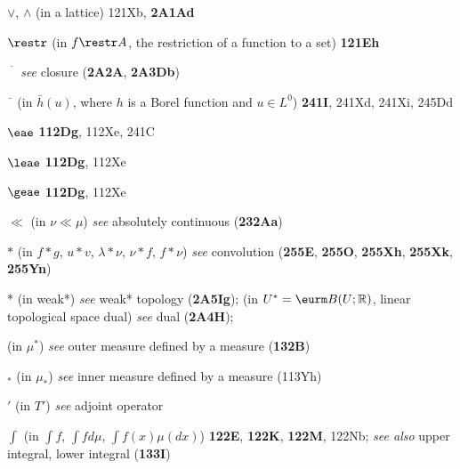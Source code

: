 $\vee$, $\wedge$ (in a lattice) 121Xb, {\bf 2A1Ad}






$\restr$ (in $f\restr A$, the restriction of a function to a set) {\bf
121Eh}

$\overline{\phantom{A}}$ {\it see} closure ({\bf 2A2A}, {\bf
2A3Db})


$\bar{\phantom{g}}$ (in $\bar h(u)$, where $h$ is a Borel function
and $u\in L^0$) {\bf 241I}, 241Xd, 241Xi, 245Dd


$\eae$ {\bf 112Dg}, 112Xe, 241C

$\leae$ {\bf 112Dg}, 112Xe

$\geae$ {\bf 112Dg}, 112Xe







$\ll$ (in $\nu\ll\mu$) {\it see} absolutely continuous ({\bf 232Aa})





















$*$ (in $f*g$, $u*v$, $\lambda*\nu$, $\nu*f$, $f*\nu$) {\it see}
convolution ({\bf 255E}, {\bf 255O}, {\bf 255Xh},
{\bf 255Xk}, {\bf 255Yn})


* (in weak*) {\it see} weak* topology ({\bf 2A5Ig}); 
 (in $U^*=\eurm B(U;\Bbb R)$, linear topological space dual)
{\it see} dual ({\bf 2A4H});  
 
(in $\mu^*$) {\it see} outer measure defined by a measure ({\bf 132B})

$_*$ (in $\mu_*$) {\it see} inner measure defined by a measure
(113Yh)

$'$
(in $T'$) {\it see} adjoint operator















$\int$ (in $\int f$, $\int fd\mu$, $\int f(x)\mu(dx)$) {\bf 122E}, {\bf
122K}, {\bf 122M}, 122Nb;
  {\it see also} upper integral, lower integral ({\bf 133I})

